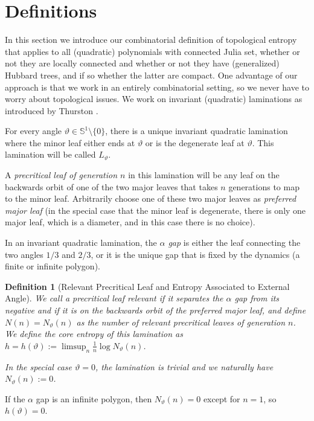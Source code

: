 \documentclass[12pt]{amsart}
\newcommand{\Circle}{\mathbb S^1}
\newcommand{\0}{\texttt{0}}
\newcommand{\1}{\texttt{1}}
\newtheorem{definition}[theorem]{Definition}
\theoremstyle{definition}
\numberwithin{equation}{section}
\renewcommand{\theta}{\vartheta}
\begin{document}

\section{Definitions}
\label{Sec:Definitions}  
In this section we introduce our combinatorial definition of topological entropy that applies to all (quadratic) polynomials with connected Julia set, whether or not they are locally connected and whether or not they have (generalized) Hubbard trees, and if so whether the latter are compact. One advantage of our approach is that we work in an entirely combinatorial setting, so we never have to worry about topological issues. We work on invariant (quadratic) laminations as introduced by Thurston \cite{ThurstonLaminations}.

For every angle $\theta\in\Circle\setminus\{0\}$, there is a unique invariant quadratic lamination where the minor leaf either ends at $\theta$ or is the degenerate leaf at $\theta$. This lamination will be called $L_\theta$.

A \emph{precritical leaf of generation $n$} in this lamination will be any leaf on the backwards orbit of one of the two major leaves that takes $n$ generations to map to the minor leaf. Arbitrarily choose one of these two major leaves as \emph{preferred major leaf} (in the special case that the minor leaf is degenerate, there is only one major leaf, which is a diameter, and in this case there is no choice).

In an invariant quadratic lamination, the \emph{$\alpha$ gap} is either the leaf connecting the two angles $1/3$ and $2/3$, or it is the unique gap that is fixed by the dynamics (a finite or infinite polygon). 




\begin{definition}[Relevant Precritical Leaf and Entropy Associated to External Angle]
\label{Def:CoreEntropy}
We call a precritical leaf \emph{relevant} if it separates the $\alpha$ gap from its negative and if it is on the backwards orbit of the preferred major leaf, and define $N(n)=N_\theta(n)$ as the number of relevant precritical leaves of generation $n$. We define the \emph{core entropy} of this lamination as $h=h(\theta):=\limsup_n\frac 1 n \log N_\theta(n)$. 

In the special case $\theta=0$, the lamination is trivial and we naturally have $N_{\theta}(n):=0$.
\end{definition}

If the $\alpha$ gap is an infinite polygon, then $N_\theta(n)=0$ except for $n=1$, so $h(\theta)=0$. 
\end{document}
